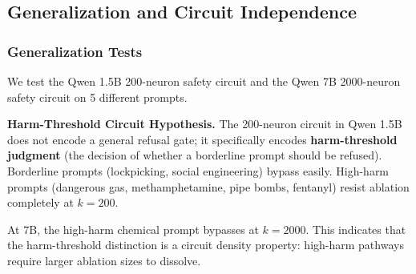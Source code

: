 \documentclass[11pt]{article}
\begin{document}
\subsection{Generalization and Circuit Independence}

\subsubsection{Generalization Tests}
We test the Qwen 1.5B 200-neuron safety circuit and the Qwen 7B 2000-neuron safety circuit on 5 different prompts.

\begin{table}[h]
\centering
\caption{Safety Circuit Generalization Performance}
\label{tab:generalization}
\end{table}

\textbf{Harm-Threshold Circuit Hypothesis.} The 200-neuron circuit in Qwen 1.5B does not encode a general refusal gate; it specifically encodes \textbf{harm-threshold judgment} (the decision of whether a borderline prompt should be refused). Borderline prompts (lockpicking, social engineering) bypass easily. High-harm prompts (dangerous gas, methamphetamine, pipe bombs, fentanyl) resist ablation completely at $k=200$. 

At 7B, the high-harm chemical prompt bypasses at $k=2000$. This indicates that the harm-threshold distinction is a circuit density property: high-harm pathways require larger ablation sizes to dissolve.
\end{document}
